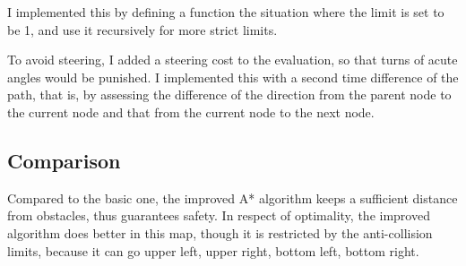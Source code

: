 \documentclass[aps,letterpaper,10pt]{revtex4}
\begin{document}
\vspace{3mm} 
I implemented this by defining a function the situation where the limit is set to be 1, and use it recursively for more strict limits.
\vspace{5mm}
	
	\vspace{3mm}

\vspace{3mm} 
To avoid steering, I added a steering cost to the evaluation, so that turns of acute angles would be punished. I implemented this with a second time difference of the path, that is, by assessing the difference of the direction from the parent node to the current node and that from the current node to the next node. 

\vspace{5mm}
	
	\vspace{3mm}


\vspace{5mm}
	
	\vspace{3mm}
	
\subsection{Comparison}
\vspace{3mm} 
Compared to the basic one, the improved A* algorithm keeps a sufficient distance from obstacles, thus guarantees safety. In respect of optimality, the improved algorithm does better in this map, though it is restricted by the anti-collision limits, because it can go upper left, upper right, bottom left, bottom right. 


\newpage
\end{document}
